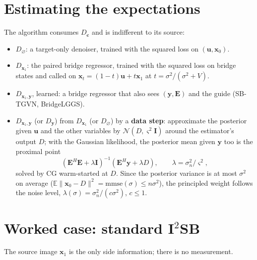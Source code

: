 \documentclass[11pt]{article}
\theoremstyle{remark}
\newcommand{\x}{\bm{x}}
\newcommand{\y}{\bm{y}}
\newcommand{\uu}{\bm{u}}
\newcommand{\cc}{\bm{c}}
\newcommand{\E}{\mathbb{E}}
\newcommand{\N}{\mathcal{N}}
\newcommand{\Id}{\bm{I}}
\newcommand{\Op}{\bm{E}}
\newcommand{\Dz}{D_{\varnothing}}
\newcommand{\Dg}{D_{\x_1}}
\newcommand{\Dy}{D_{\y}}
\newcommand{\Dgy}{D_{\x_1,\y}}
\begin{document}
\section{Estimating the expectations}\label{sec:estimators}

The algorithm consumes $D_{\cc}$ and is indifferent to its source:
\begin{itemize}[leftmargin=1.5em, itemsep=2pt]
  \item $\Dz$: a target-only denoiser, trained with the squared loss on $(\uu,\x_0)$.
  \item $\Dg$: the paired bridge regressor, trained with the squared loss on bridge states and
        called on $\x_t = (1-t)\uu + t\x_1$ at $t = \sigma^2/(\sigma^2+V)$.
  \item $\Dgy$, learned: a bridge regressor that also sees $(\y,\Op)$ and the guide (SB-TGVN,
        BridgeLGGS).
  \item $\Dgy$ (or $\Dy$) from $\Dg$ (or $\Dz$) by a \textbf{data step}: approximate the
        posterior given $\uu$ and the other variables by $\N(D, \varsigma^2\Id)$ around the
        estimator's output $D$; with the Gaussian likelihood, the posterior mean given $\y$ too
        is the proximal point
        \begin{equation}
          (\Op^H\Op + \lambda\Id)^{-1}(\Op^H\y + \lambda D),\qquad
          \lambda = \sigma_n^2/\varsigma^2,
          \label{eq:prox}
        \end{equation}
        solved by CG warm-started at $D$. Since the posterior variance is at most $\sigma^2$ on
        average ($\E\|\x_0 - D\|^2 = \mathrm{mmse}(\sigma)\le n\sigma^2$), the principled
        weight follows the noise level, $\lambda(\sigma) = \sigma_n^2/(c\sigma^2)$, $c\le1$.
\end{itemize}

\section{Worked case: standard I\texorpdfstring{$^2$}{2}SB}\label{sec:i2sb}

The source image $\x_1$ is the only side information; there is no measurement.
\end{document}
